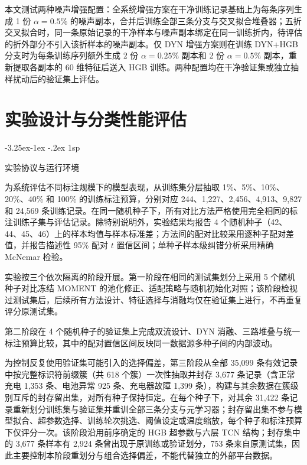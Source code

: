 \documentclass[12pt]{iopjournal}
\makeatletter
\renewcommand\subsection{\@startsection{subsection}{2}{\z@}%
                   {-3.25ex\@plus -1ex \@minus -.2ex}%
                   {1sp}%
                   {\reset@font\normalsize\bfseries\raggedright}}
\makeatother
\begin{document}
本文测试两种噪声增强配置：全系统增强方案在干净训练记录基础上为每条序列生成 1 份 $\alpha=0.5\%$ 的噪声副本，合并后训练全部三条分支与交叉拟合堆叠器；五折交叉拟合时，同一条原始记录的干净样本与噪声副本绑定在同一训练折内，待评估的折外部分不引入该折样本的噪声副本。仅 DYN 增强方案则在训练 DYN+HGB 分支时为每条训练序列额外生成 2 份 $\alpha=0.25\%$ 副本和 2 份 $\alpha=0.5\%$ 副本，重新提取各副本的 60 维特征后送入 HGB 训练。两种配置均在干净验证集或独立抽样扰动后的验证集上评估。

\section{实验设计与分类性能评估}\label{sec:exp}

\subsection{实验协议与运行环境}\label{sec:protocol}

为系统评估不同标注规模下的模型表现，从训练集分层抽取 1\%、5\%、10\%、20\%、40\% 和 100\% 的训练标注预算，分别对应 244、1,227、2,456、4,913、9,827 和 24,569 条训练记录。在同一随机种子下，所有对比方法严格使用完全相同的标注训练子集与评估记录。除特别说明外，实验结果均报告 4 个随机种子（42、44、45、46）上的样本均值与样本标准差；方法间的配对比较采用逐种子配对差值，并报告描述性 95\% 配对 $t$ 置信区间；单种子样本级纠错分析采用精确 McNemar 检验。

实验按三个依次隔离的阶段开展。第一阶段在相同的测试集划分上采用 5 个随机种子对比冻结 MOMENT 的池化修正、适配策略与随机初始化对照；该阶段检视过测试集后，后续所有方法设计、特征选择与消融均仅在验证集上进行，不再重复评分原测试集。

第二阶段在 4 个随机种子的验证集上完成双流设计、DYN 消融、三路堆叠与统一标注预算比较，其中的配对置信区间反映同一数据源多种子间的内部波动。

为控制反复使用验证集可能引入的选择偏差，第三阶段从全部 35,099 条有效记录中按完整标识符前缀簇（共 618 个簇）一次性抽取并封存 3,677 条记录（含正常充电 1,353 条、电池异常 925 条、充电器故障 1,399 条），构建与其余数据在簇级别互斥的封存留出集，对所有种子保持恒定。在每个种子下，对其余 31,422 条记录重新划分训练集与验证集并重训全部三条分支与元学习器；封存留出集不参与模型拟合、超参数选择、训练轮次挑选、阈值设定或温度缩放，每个种子和标注预算下仅评分一次。该阶段沿用前序确定的 HGB 超参数与六层 TCN 结构；封存集中的 3,677 条样本有 2,924 条曾出现于原训练或验证划分，753 条来自原测试集，因此主要控制本阶段重划分与组合选择偏差，不能代替独立的外部平台数据。
\end{document}
